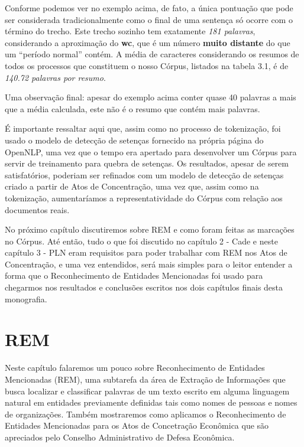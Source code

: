 \documentclass[11pt]{report}
\newcommand{\quotes}[1]{``#1''}
\begin{document}
Conforme podemos ver no exemplo acima, de fato, a única pontuação que pode ser considerada tradicionalmente como o final de uma sentença só ocorre com o término do trecho. Este trecho
sozinho tem exatamente \textit{181 palavras}, considerando a aproximação do \textbf{wc}, que é um número \textbf{muito distante} do que um \quotes{período normal} contém. A média
de caracteres considerando os resumos de todos os processos que constituem o nosso Córpus, listados na tabela 3.1, é de \textit{140.72 palavras por resumo}.

Uma observação final: apesar do exemplo acima conter quase 40 palavras a mais que a média calculada, este não é o resumo que contém mais palavras.

É importante ressaltar aqui que, assim como no processo de tokenização, foi usado o modelo de detecção de setenças fornecido na própria página do OpenNLP, uma vez que o tempo era
apertado para desenvolver um Córpus para servir de treinamento para quebra de setenças. Os resultados, apesar de serem satisfatórios, poderiam ser refinados com um modelo
de detecção de setenças criado a partir de Atos de Concentração, uma vez que, assim como na tokenização, aumentaríamos a representatividade do Córpus com relação aos documentos
reais.

No próximo capítulo discutiremos sobre REM e como foram feitas as marcações no Córpus. Até então, tudo o que foi discutido no capítulo 2 - Cade e neste capítulo 3 - PLN eram
requisitos para poder trabalhar com REM nos Atos de Concentração, e uma vez entendidos, será mais simples para o leitor entender a forma que o Reconhecimento de Entidades
Mencionadas foi usado para chegarmos nos resultados e conclusões escritos nos dois capítulos finais desta monografia.

\pagebreak
\chapter{REM}

\indent\indent Neste capítulo falaremos um pouco sobre Reconhecimento de Entidades Mencionadas (REM), uma subtarefa da área de Extração de Informações que busca localizar e classificar
palavras de um texto escrito em alguma linguagem natural em entidades previamente definidas tais como nomes de pessoas e nomes de organizações. Também mostraremos como
aplicamos o Reconhecimento de Entidades Mencionadas para os Atos de Concetração Econômica que são apreciados pelo Conselho Administrativo de Defesa Econômica.
\end{document}
